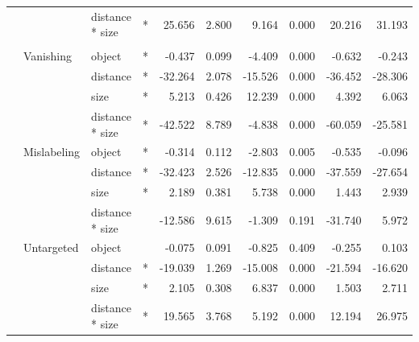 \documentclass[
]{article}
\begin{document}
\begin{longtable}[t]{llllrrrrrr}
\cmidrule{3-10}\nopagebreak
\hspace{1em} &  & distance * size & * & 25.656 & 2.800 & 9.164 & 0.000 & 20.216 & 31.193\\
\cmidrule{1-10}\pagebreak[0]
\addlinespace[0.3em]
\multicolumn{10}{l}{\textbf{Cascade R-CNN}}\\
\hspace{1em} & Vanishing & object & * & -0.437 & 0.099 & -4.409 & 0.000 & -0.632 & -0.243\\
\cmidrule{3-10}\nopagebreak
\hspace{1em} &  & distance & * & -32.264 & 2.078 & -15.526 & 0.000 & -36.452 & -28.306\\
\cmidrule{3-10}\nopagebreak
\hspace{1em} &  & size & * & 5.213 & 0.426 & 12.239 & 0.000 & 4.392 & 6.063\\
\cmidrule{3-10}\nopagebreak
\hspace{1em} &  & distance * size & * & -42.522 & 8.789 & -4.838 & 0.000 & -60.059 & -25.581\\
\cmidrule{2-10}\nopagebreak
\hspace{1em} & Mislabeling & object & * & -0.314 & 0.112 & -2.803 & 0.005 & -0.535 & -0.096\\
\cmidrule{3-10}\nopagebreak
\hspace{1em} &  & distance & * & -32.423 & 2.526 & -12.835 & 0.000 & -37.559 & -27.654\\
\cmidrule{3-10}\nopagebreak
\hspace{1em} &  & size & * & 2.189 & 0.381 & 5.738 & 0.000 & 1.443 & 2.939\\
\cmidrule{3-10}\nopagebreak
\hspace{1em} &  & distance * size &  & -12.586 & 9.615 & -1.309 & 0.191 & -31.740 & 5.972\\
\cmidrule{2-10}\nopagebreak
\hspace{1em} & Untargeted & object &  & -0.075 & 0.091 & -0.825 & 0.409 & -0.255 & 0.103\\
\cmidrule{3-10}\nopagebreak
\hspace{1em} &  & distance & * & -19.039 & 1.269 & -15.008 & 0.000 & -21.594 & -16.620\\
\cmidrule{3-10}\nopagebreak
\hspace{1em} &  & size & * & 2.105 & 0.308 & 6.837 & 0.000 & 1.503 & 2.711\\
\cmidrule{3-10}\nopagebreak
\hspace{1em} &  & distance * size & * & 19.565 & 3.768 & 5.192 & 0.000 & 12.194 & 26.975\\
\bottomrule
\end{longtable}
\endgroup{}
\end{document}
